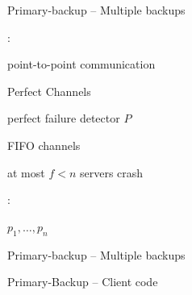 \begin{frame}{Primary-backup -- Multiple backups}

:

\BI
\item point-to-point communication
\item \alert{Perfect Channels}
\item perfect failure detector $P$
\item FIFO channels
\item at most $f < n$ servers crash
\EI

\bigskip
{}:
\BI
\item $p_1, \ldots, p_n$
\EI	

\end{frame}

\begin{frame}[shrink=15]{Primary-backup -- Multiple backups}

\begin{Procedure}
\caption{Protocol executed by process $p_i$}
\BlankLine
{}
\BlankLine
{}
\end{Procedure}

\end{frame}

\begin{frame}[shrink=10]{Primary-Backup -- Client code}

\begin{Procedure}
\caption{Protocol executed by client $c$}

\BlankLine
{}
\BlankLine
{}
\BlankLine
{}
\end{Procedure}	
	
\end{frame}


